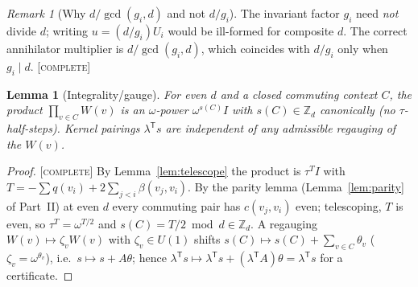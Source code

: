 \documentclass[11pt]{article}
\newtheorem{lemma}[theorem]{Lemma}
\theoremstyle{definition}
\theoremstyle{remark}
\newtheorem{remark}[theorem]{Remark}
\newcommand{\Z}{\mathbb{Z}}
\newcommand{\Zd}{\Z_d}
\newcommand{\CO}{\textnormal{\textsc{[complete]}}}
\begin{document}
\begin{remark}[Why $d/\gcd(g_i,d)$ and not $d/g_i$]
The invariant factor $g_i$ need \emph{not} divide $d$; writing $u=(d/g_i)U_i$ would be ill-formed for
composite $d$. The correct annihilator multiplier is $d/\gcd(g_i,d)$, which coincides with $d/g_i$
only when $g_i\mid d$. \CO
\end{remark}

\begin{lemma}[Integrality/gauge]\label{lem:integral}
For even $d$ and a closed commuting context $C$, the product $\prod_{v\in C}W(v)$ is an
$\omega$-power $\omega^{s(C)}I$ with $s(C)\in\Zd$ \emph{canonically} (no $\tau$-half-steps). Kernel
pairings $\lambda^{\mathsf T}s$ are independent of any admissible regauging of the $W(v)$.
\end{lemma}
\begin{proof}
\CO{} By Lemma~\ref{lem:telescope} the product is $\tau^{T}I$ with
$T=-\sum q(v_i)+2\sum_{j<i}\beta(v_j,v_i)$. By the parity lemma (Lemma~\ref{lem:parity} of
Part~II) at even $d$ every commuting pair has $c(v_j,v_i)$ even; telescoping, $T$ is even, so
$\tau^{T}=\omega^{T/2}$ and $s(C)=T/2\bmod d\in\Zd$. A regauging $W(v)\mapsto\zeta_vW(v)$ with
$\zeta_v\in U(1)$ shifts $s(C)\mapsto s(C)+\sum_{v\in C}\theta_v$ ($\zeta_v=\omega^{\theta_v}$), i.e.\
$s\mapsto s+A\theta$; hence $\lambda^{\mathsf T}s\mapsto\lambda^{\mathsf T}s+(\lambda^{\mathsf
T}A)\theta=\lambda^{\mathsf T}s$ for a certificate.
\end{proof}
\end{document}
